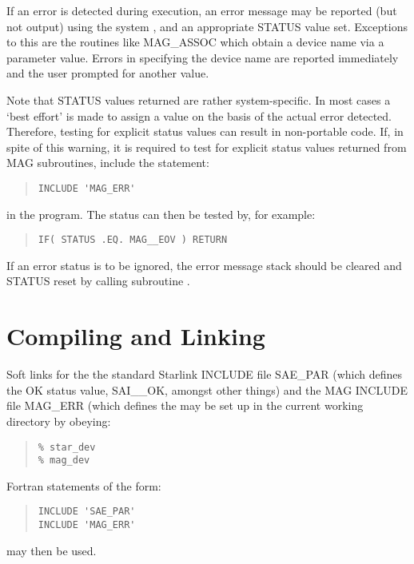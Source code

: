If an error is detected during execution, an error message may be reported
(but not output) using the 
system , and an appropriate STATUS value set.
Exceptions to this are the routines like MAG\_ASSOC which obtain a device name
via a parameter value. Errors in specifying the device name are reported
immediately and the user prompted for another value.

Note that STATUS values returned are rather system-specific. In most cases a
`best effort' is made to assign a value on the basis of the actual error
detected. Therefore, testing for explicit status values can result in
non-portable code. If, in spite of this warning, it is required to test for
explicit status values returned from MAG subroutines, include the statement:

\small
\begin{quote} \begin{verbatim}
INCLUDE 'MAG_ERR'
\end{verbatim} \end{quote}
\normalsize

in the program. The status can then be tested by, for example:

\small
\begin{quote} \begin{verbatim}
IF( STATUS .EQ. MAG__EOV ) RETURN
\end{verbatim} \end{quote}
\normalsize

If an error status is to be ignored, the error message stack should be
cleared and STATUS reset by calling subroutine
.

\section{Compiling and Linking}
Soft links for the the standard Starlink INCLUDE file SAE\_PAR (which defines
the OK status value, SAI\_\_OK, amongst other things) and the MAG INCLUDE file
MAG\_ERR (which defines the
 may be set up in the current
working directory by obeying:
\small
\begin{quote} \begin{verbatim}
% star_dev
% mag_dev
\end{verbatim} \end{quote}
\normalsize
Fortran statements of the form:
\small
\begin{quote} \begin{verbatim}
INCLUDE 'SAE_PAR'
INCLUDE 'MAG_ERR'
\end{verbatim} \end{quote}
\normalsize
may then be used.


